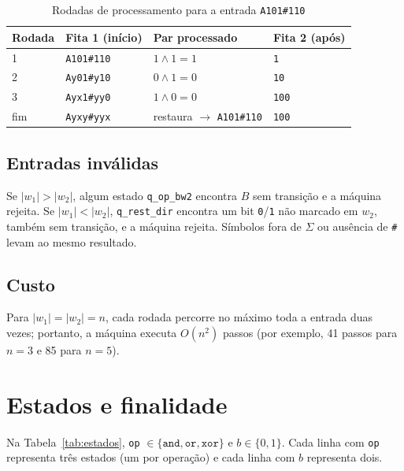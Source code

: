 \documentclass[report, 12pt]{uftreport}
\newcommand{\s}[1]{\texttt{#1}}
\begin{document}
\begin{table}[H]
\centering
\caption{Rodadas de processamento para a entrada \s{A101\#110}}
\label{tab:rodadas}
\begin{tabular}{llll}
\toprule
\textbf{Rodada} & \textbf{Fita 1 (início)} & \textbf{Par processado} & \textbf{Fita 2 (após)} \\
\midrule
1 & \s{A101\#110} & $1 \land 1 = 1$ & \s{1} \\
2 & \s{Ay01\#y10} & $0 \land 1 = 0$ & \s{10} \\
3 & \s{Ayx1\#yy0} & $1 \land 0 = 0$ & \s{100} \\
fim & \s{Ayxy\#yyx} & restaura $\to$ \s{A101\#110} & \s{100} \\
\bottomrule
\end{tabular}
\end{table}

\subsection{Entradas inválidas}

Se $|w_1| > |w_2|$, algum estado \s{q\_op\_bw2} encontra $B$ sem transição e a
máquina rejeita. Se $|w_1| < |w_2|$, \s{q\_rest\_dir} encontra um bit \s{0}/\s{1}
não marcado em $w_2$, também sem transição, e a máquina rejeita. Símbolos fora de
$\Sigma$ ou ausência de \s{\#} levam ao mesmo resultado.

\subsection{Custo}

Para $|w_1| = |w_2| = n$, cada rodada percorre no máximo toda a entrada duas vezes;
portanto, a máquina executa $O(n^2)$ passos (por exemplo, 41 passos para $n=3$ e 85
para $n=5$).

\section{Estados e finalidade}
\label{sec:estados}

Na Tabela~\ref{tab:estados}, \s{op} $\in \{\s{and}, \s{or}, \s{xor}\}$ e
$b \in \{0,1\}$. Cada linha com \s{op} representa três estados (um por operação) e
cada linha com $b$ representa dois.
\end{document}
